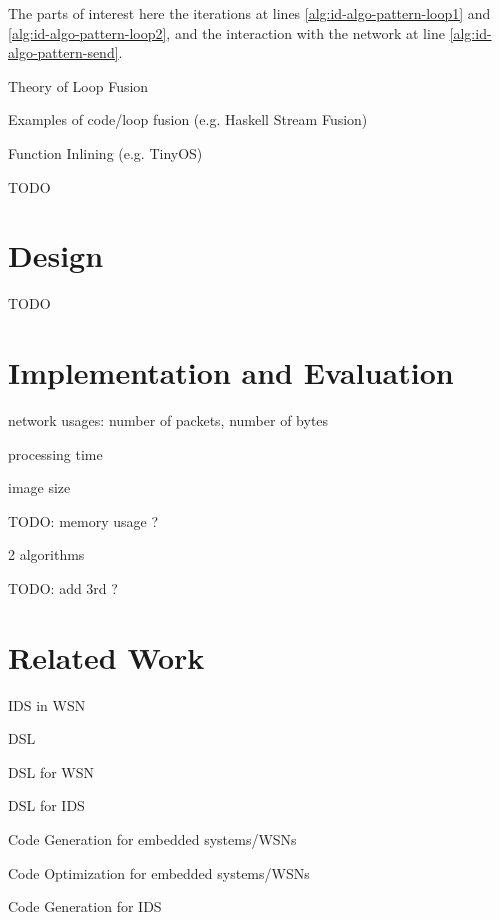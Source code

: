 \documentclass[conference]{IEEEtran}
\begin{document}
The parts of interest here the iterations at lines
\ref{alg:id-algo-pattern-loop1} and \ref{alg:id-algo-pattern-loop2}, and the
interaction with the network at line \ref{alg:id-algo-pattern-send}. 


Theory of Loop Fusion \cite{darte2000complexity}

Examples of code/loop fusion (e.g. Haskell Stream Fusion) \cite{coutts2007stream}

Function Inlining (e.g. TinyOS) \cite{gay2007software,gay2003nesc}

TODO

\section{Design}
\label{design}

TODO

\section{Implementation and Evaluation}
\label{evaluation}

network usages: number of packets, number of bytes

processing time

image size

TODO: memory usage ?

2 algorithms \cite{ganeriwal2008reputation}

TODO: add 3rd ? \cite{krontiris2009cooperative}

\section{Related Work}
\label{related}

IDS in WSN \cite{perrig2004security,mishra2004intrusion}

DSL \cite{fowler2010domain,mernik2005and}

DSL for WSN \cite{naumowicz2009prototyping,levis2004tinyscript}

DSL for IDS \cite{eckmann2002statl}

Code Generation for embedded systems/WSNs \cite{leupers2000code,marwedel2002code}

Code Optimization for embedded systems/WSNs \cite{panda2001data,naik2001software}

Code Generation for IDS \cite{charitakis2003code}

\end{document}
